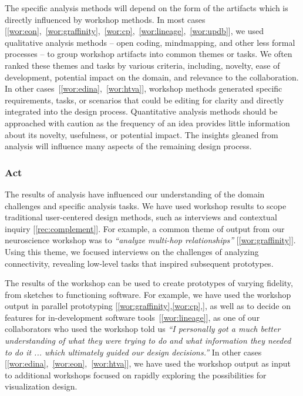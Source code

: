 The specific analysis methods will depend on the form of the artifacts which is directly influenced by workshop methods. In most cases [\ref{wor:eon},~\ref{wor:graffinity},~\ref{wor:cp},~\ref{wor:lineage},~\ref{wor:updb}],  we used qualitative analysis methods -- open coding, mindmapping, and other less formal processes -- to group workshop artifacts into common themes or tasks. We often ranked these themes and tasks by various criteria, including, novelty, ease of development, potential impact on the domain, and relevance to the collaboration.  In other cases~[\ref{wor:edina},~\ref{wor:htva}], workshop methods generated specific requirements, tasks, or scenarios that could be editing for clarity and directly integrated into the design process. Quantitative analysis methods should be approached with caution as the frequency of an idea provides little information about its novelty, usefulness, or potential impact. The insights gleaned from analysis will influence many aspects of the remaining design process. 

\subsubsection{Act}

The results of analysis have influenced our understanding of the domain challenges and specific analysis tasks. We have used workshop results to scope traditional  user-centered design methods, such as interviews and contextual inquiry [\ref{rec:complement}]. For example, a common theme of output from our neuroscience workshop was to \emph{``analyze multi-hop relationships''} [\ref{wor:graffinity}]. Using this theme, we focused interviews on the challenges of analyzing connectivity, revealing low-level tasks that inspired subsequent prototypes.

The results of the workshop can be used to create prototypes of varying fidelity, from sketches to functioning software. For example, we have used the workshop output in parallel prototyping [\ref{wor:graffinity},\ref{wor:cp},], as well as to decide on features for in-development software tools~[\ref{wor:lineage}], as one of our collaborators who used the workshop told us \emph{``I personally got a much better understanding of what they were trying to do and what information they needed to do it ... which ultimately guided our design decisions.''} In other cases [\ref{wor:edina},~\ref{wor:eon},~\ref{wor:htva}], we have used the workshop output as input to additional workshops focused on rapidly exploring the possibilities for visualization design. 

